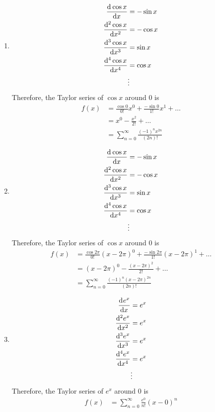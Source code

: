 \documentclass[fleqn, a4paper, 12pt, oneside]{amsart}
\theoremstyle{definition}
\theoremstyle{theorem}
\begin{document}
\begin{solution}
	\begin{enumerate}[leftmargin = *]
		\item
			\begin{align*}
				\dod{\cos x}{x} &= -\sin x\\
				\dod[2]{\cos x}{x} &= -\cos x\\
				\dod[3]{\cos x}{x} &= \sin x\\
				\dod[4]{\cos x}{x} &= \cos x\\
				&\vdots
			\end{align*}
			Therefore, the Taylor series of $\cos x$ around $0$ is
			\begin{align*}
				f(x) &= \frac{\cos 0}{0!} x^0 + \frac{-\sin 0}{1!} x^1 + \dots\\
				&= x^0 - \frac{x^2}{2!} + \dots\\
				&= \sum\limits_{n = 0}^{\infty} \frac{(-1)^n x^{2 n}}{(2 n)!}
			\end{align*}
		\item
			\begin{align*}
				\dod{\cos x}{x} &= -\sin x\\
				\dod[2]{\cos x}{x} &= -\cos x\\
				\dod[3]{\cos x}{x} &= \sin x\\
				\dod[4]{\cos x}{x} &= \cos x\\
				&\vdots
			\end{align*}
			Therefore, the Taylor series of $\cos x$ around $0$ is
			\begin{align*}
				f(x) &= \frac{\cos 2 \pi}{0!} (x - 2 \pi)^0 + \frac{-\sin 2 \pi}{1!} (x - 2 \pi)^1 + \dots\\
				&= (x - 2 \pi)^0 - \frac{(x - 2 \pi)^2}{2!} + \dots\\
				&= \sum\limits_{n = 0}^{\infty} \frac{(-1)^n (x - 2 \pi)^{2 n}}{(2 n)!}
			\end{align*}
		\item
			\begin{align*}
				\dod{e^x}{x} &= e^x\\
				\dod[2]{e^x}{x} &= e^x\\
				\dod[3]{e^x}{x} &= e^x\\
				\dod[4]{e^x}{x} &= e^x\\
				&\vdots
			\end{align*}
			Therefore, the Taylor series of $e^x$ around $0$ is
			\begin{align*}
				f(x) &= \sum\limits_{n = 0}^{\infty} \frac{e^0}{n!} (x - 0)^n\\

\end{align*}
\end{enumerate}
\end{solution}
\end{document}
